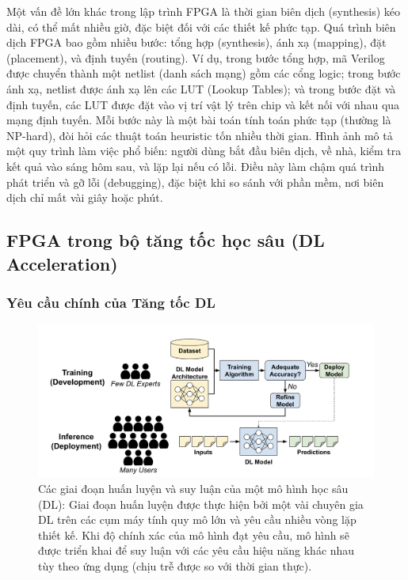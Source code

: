 \documentclass[a4paper]{article}
\begin{document}
\begin{itemize}
    Một vấn đề lớn khác trong lập trình FPGA là thời gian biên dịch (synthesis) kéo dài, có thể mất nhiều giờ, đặc biệt đối với các thiết kế phức tạp. Quá trình biên dịch FPGA bao gồm nhiều bước: tổng hợp (synthesis), ánh xạ (mapping), đặt (placement), và định tuyến (routing). Ví dụ, trong bước tổng hợp, mã Verilog được chuyển thành một netlist (danh sách mạng) gồm các cổng logic; trong bước ánh xạ, netlist được ánh xạ lên các LUT (Lookup Tables); và trong bước đặt và định tuyến, các LUT được đặt vào vị trí vật lý trên chip và kết nối với nhau qua mạng định tuyến. Mỗi bước này là một bài toán tính toán phức tạp (thường là NP-hard), đòi hỏi các thuật toán heuristic tốn nhiều thời gian. Hình ảnh mô tả một quy trình làm việc phổ biến: người dùng bắt đầu biên dịch, về nhà, kiểm tra kết quả vào sáng hôm sau, và lặp lại nếu có lỗi. Điều này làm chậm quá trình phát triển và gỡ lỗi (debugging), đặc biệt khi so sánh với phần mềm, nơi biên dịch chỉ mất vài giây hoặc phút.

\end{itemize}
\subsection{FPGA trong bộ tăng tốc học sâu (DL Acceleration)}
\subsubsection{Yêu cầu chính của Tăng tốc DL }
\begin{figure} [!h]
    \centering
    \includegraphics[width=0.75\linewidth]{assets/fpga_2.png}
    \caption{Các giai đoạn huấn luyện và suy luận của một mô hình học sâu (DL): Giai đoạn huấn luyện được thực hiện bởi một vài chuyên gia DL trên các cụm máy tính quy mô lớn và yêu cầu nhiều vòng lặp thiết kế. Khi độ chính xác của mô hình đạt yêu cầu, mô hình sẽ được triển khai để suy luận với các yêu cầu hiệu năng khác nhau tùy theo ứng dụng (chịu trễ được so với thời gian thực).}
    \label{fig:fpga_2}
\end{figure}
\end{document}
